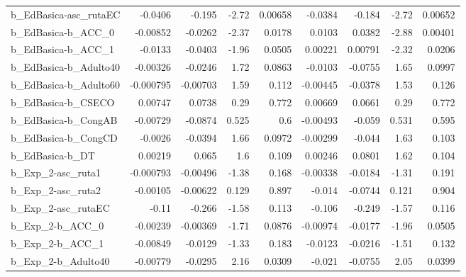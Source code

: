 \begin{tabular}{lrrrrrrrr}
b\_EdBasica-asc\_rutaEC      &     -0.0406 &       -0.195 &     -2.72 &  0.00658 &    -0.0384 &      -0.184 &        -2.72 &       0.00652 \\
b\_EdBasica-b\_ACC\_0         &    -0.00852 &      -0.0262 &     -2.37 &   0.0178 &     0.0103 &      0.0382 &        -2.88 &       0.00401 \\
b\_EdBasica-b\_ACC\_1         &     -0.0133 &      -0.0403 &     -1.96 &   0.0505 &    0.00221 &     0.00791 &        -2.32 &        0.0206 \\
b\_EdBasica-b\_Adulto40      &    -0.00326 &      -0.0246 &      1.72 &   0.0863 &    -0.0103 &     -0.0755 &         1.65 &        0.0997 \\
b\_EdBasica-b\_Adulto60      &   -0.000795 &     -0.00703 &      1.59 &    0.112 &   -0.00445 &     -0.0378 &         1.53 &         0.126 \\
b\_EdBasica-b\_CSECO         &     0.00747 &       0.0738 &      0.29 &    0.772 &    0.00669 &      0.0661 &         0.29 &         0.772 \\
b\_EdBasica-b\_CongAB        &    -0.00729 &      -0.0874 &     0.525 &      0.6 &   -0.00493 &      -0.059 &        0.531 &         0.595 \\
b\_EdBasica-b\_CongCD        &     -0.0026 &      -0.0394 &      1.66 &   0.0972 &   -0.00299 &      -0.044 &         1.63 &         0.103 \\
b\_EdBasica-b\_DT            &     0.00219 &        0.065 &       1.6 &    0.109 &    0.00246 &      0.0801 &         1.62 &         0.104 \\
b\_Exp\_2-asc\_ruta1          &   -0.000793 &     -0.00496 &     -1.38 &    0.168 &   -0.00338 &     -0.0184 &        -1.31 &         0.191 \\
b\_Exp\_2-asc\_ruta2          &    -0.00105 &     -0.00622 &     0.129 &    0.897 &     -0.014 &     -0.0744 &        0.121 &         0.904 \\
b\_Exp\_2-asc\_rutaEC         &       -0.11 &       -0.266 &     -1.58 &    0.113 &     -0.106 &      -0.249 &        -1.57 &         0.116 \\
b\_Exp\_2-b\_ACC\_0            &    -0.00239 &     -0.00369 &     -1.71 &   0.0876 &   -0.00974 &     -0.0177 &        -1.96 &        0.0505 \\
b\_Exp\_2-b\_ACC\_1            &    -0.00849 &      -0.0129 &     -1.33 &    0.183 &    -0.0123 &     -0.0216 &        -1.51 &         0.132 \\
b\_Exp\_2-b\_Adulto40         &    -0.00779 &      -0.0295 &      2.16 &   0.0309 &     -0.021 &     -0.0755 &         2.05 &        0.0399 \\

\end{tabular}
